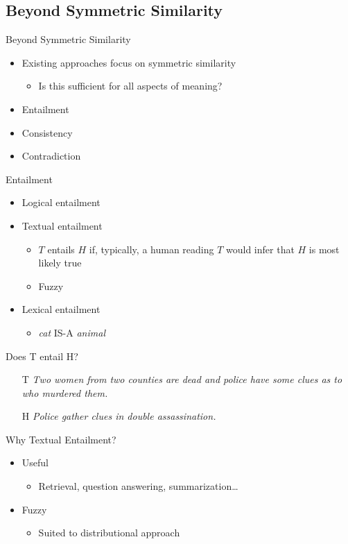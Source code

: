 \documentclass{beamer}
\newlength{\wideitemsep}
\let\olditem\item
\renewcommand{\item}{\setlength{\itemsep}{\wideitemsep}\olditem}
\begin{document}
\subsection{Beyond Symmetric Similarity}

\begin{frame}{Beyond Symmetric Similarity}
\begin{itemize}
\item Existing approaches focus on symmetric similarity
\begin{itemize}
\item Is this sufficient for all aspects of meaning?
\end{itemize}
\item Entailment
\item Consistency
\item Contradiction
\end{itemize}
\end{frame}

\begin{frame}{Entailment}
\begin{itemize}
\item Logical entailment
\item Textual entailment
\begin{itemize}
\item $T$ entails $H$ if, typically, a human reading $T$ would infer that $H$ is most likely true
\item Fuzzy
\end{itemize}
\item Lexical entailment
\begin{itemize}
\item \emph{cat} IS-A \emph{animal}
\end{itemize}
\end{itemize}
\end{frame}

\begin{frame}{Does T entail H?}
\begin{itemize}
\item[T] \emph{Two women from two counties are dead and police have some clues as to who murdered them.}
\item[H] \emph{Police gather clues in double assassination.}
\end{itemize}
\end{frame}

\begin{frame}{Why Textual Entailment?}
\begin{itemize}
\item Useful
\begin{itemize}
\item Retrieval, question answering, summarization\ldots
\end{itemize}
\item Fuzzy
\begin{itemize}
\item Suited to distributional approach
\end{itemize}
\end{itemize}
\end{frame}
\end{document}
